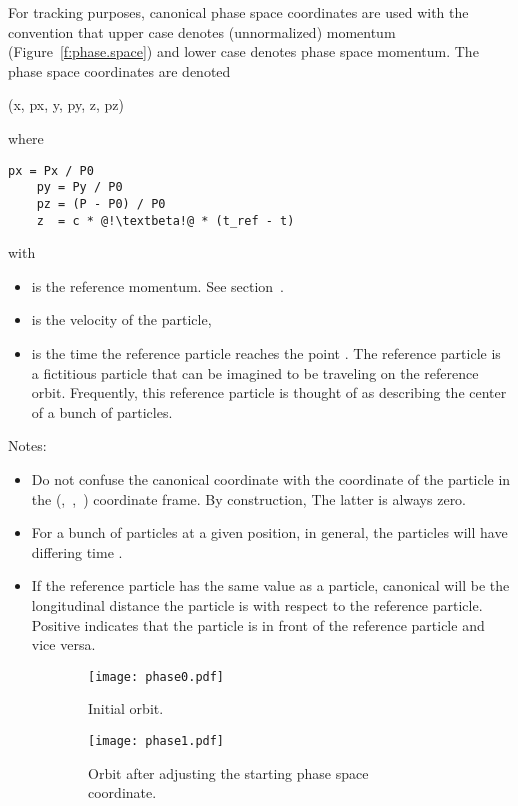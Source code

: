 \documentclass{hitec}     %
\begin{document}
{For tracking purposes, canonical phase space coordinates are used with the convention that upper
case  denotes (unnormalized) momentum (Figure~\ref{f:phase.space}) and lower case 
denotes phase space momentum. The phase space coordinates are denoted
\begin{code}
    (x, px, y, py, z, pz)
\end{code}
where
\begin{lstlisting}[mathescape]
    px = Px / P0
    py = Py / P0
    pz = (P - P0) / P0
    z  = c * @!\textbeta!@ * (t_ref - t)
\end{lstlisting}
with
\vspace{-5 pt}
\begin{itemize}
\item {} is the reference momentum. See section~.
\item {} is the velocity of the particle, 
\item {} is the time the reference particle reaches the point . The reference
particle is a fictitious particle that can be imagined to be traveling on the reference orbit.
Frequently, this reference particle is thought of as describing the center of a bunch of particles.
\end{itemize}
Notes:
\vspace{-5 pt}
\begin{itemize}
\item
Do not confuse the canonical  coordinate with the  coordinate of the particle in the
(,~,~) coordinate frame. By construction, The latter is always zero.
\item 
For a bunch of particles at a given  position, in general, the particles will have differing
time .
\item 
If the reference particle has the same {\textbeta} value as a particle, canonical  will be the
longitudinal distance the particle is with respect to the reference particle. Positive 
indicates that the particle is in front of the reference particle and vice versa.
\end{itemize}


\begin{figure}[tb]
  \centering
  \begin{subfigure}[t]{0.48\textwidth}
    \texttt{[image: phase0.pdf]}
    \caption{Initial orbit.}
    \label{f:phase0}
  \end{subfigure}
  \hfil
  \begin{subfigure}[t]{0.48\textwidth}
    \texttt{[image: phase1.pdf]}
    \caption{Orbit after adjusting the starting  phase space coordinate.}
    \label{f:phase1}
  \end{subfigure}
  \caption{}
\end{figure}

}
\end{document}
